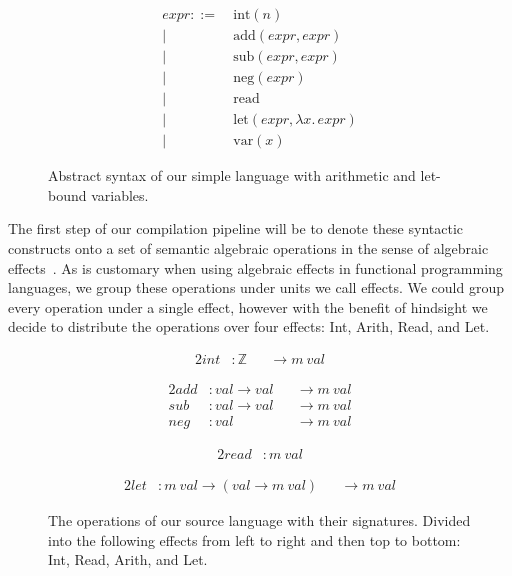 \documentclass[a4paper,UKenglish,cleveref, autoref, thm-restate, anonymous]{oasics-v2021}
\begin{document}
\begin{figure}[ht]
  \begin{align*}
    \mathit{expr} ::= &\ \mathrm{int}(n) \\
           | &\ \mathrm{add}(\mathit{expr},\mathit{expr}) \\
           | &\ \mathrm{sub}(\mathit{expr},\mathit{expr}) \\
           | &\ \mathrm{neg}(\mathit{expr}) \\
           | &\ \mathrm{read} \\
           | &\ \mathrm{let}(\mathit{expr},\lambda \mathit{x}.\,\mathit{expr}) \\
           | &\ \mathrm{var}(\mathit{x})
  \end{align*}
  \caption{Abstract syntax of our simple language with arithmetic and let-bound variables.}\label{fig:source-absyn}
\end{figure}

The first step of our compilation pipeline will be to denote these syntactic constructs onto a set of semantic algebraic operations in the sense of algebraic effects~\cite{10.1007/3-540-45315-6_1}.
As is customary when using algebraic effects in functional programming languages, we group these operations under units we call effects.
We could group every operation under a single effect, however with the benefit of hindsight we decide to distribute the operations over four effects: Int, Arith, Read, and Let.

\begin{figure}[ht]
\begin{minipage}{0.4\textwidth}
\begin{alignat*}{2}
  \mathit{int} & : \mathbb{Z} && \to m~\mathit{val}
\end{alignat*}

\begin{alignat*}{2}
  \mathit{add} & : \mathit{val} \to \mathit{val} && \to m~\mathit{val} \\
  \mathit{sub} & : \mathit{val} \to \mathit{val} && \to m~\mathit{val} \\
  \mathit{neg} & : \mathit{val}                  && \to m~\mathit{val}
\end{alignat*}
\end{minipage}%
%
\begin{minipage}{0.6\textwidth}
\begin{alignat*}{2}
  \mathit{read} & : m~\mathit{val}
\end{alignat*}

\begin{alignat*}{2}
  \mathit{let} & : m~\mathit{val} \to (\mathit{val} \to m~\mathit{val}) && \to m~\mathit{val}
\end{alignat*}
\end{minipage}
  \caption{The operations of our source language with their signatures. Divided into the following effects from left to right and then top to bottom: Int, Read, Arith, and Let.}\label{fig:source-ops}
\end{figure}
\end{document}
